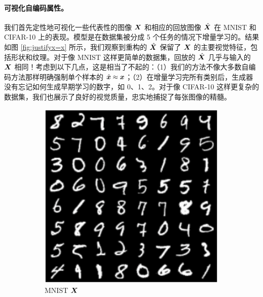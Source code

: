 \documentclass[../../book-main.tex]{subfiles}
\begin{document}
\paragraph{可视化自编码属性。}
我们首先定性地可视化一些代表性的图像 $\bm{X}$ 和相应的回放图像 $\hat{\bm{X}}$ 在 MNIST 和 CIFAR-10 上的表现。模型是在数据集被分成 5 个任务的情况下增量学习的。结果如图 \ref{fig:justifyx=x} 所示，我们观察到重构的 $\hat{\bm{X}}$ 保留了 $\bm{X}$ 的主要视觉特征，包括形状和纹理。对于像 MNIST 这样更简单的数据集，回放的 $\hat{\bm{X}}$ 几乎与输入的 $\bm{X}$ 相同！考虑到以下几点，这是相当了不起的：（1）我们的方法不像大多数自编码方法那样明确强制单个样本的 $\hat{\bm{x}} \approx \bm{x}$；（2）在增量学习完所有类别后，生成器没有忘记如何生成早期学习的数字，如 0、1、2。对于像 CIFAR-10 这样更复杂的数据集，我们也展示了良好的视觉质量，忠实地捕捉了每张图像的精髓。

\begin{figure}[t]
    \begin{subfigure}[t]{0.20\textwidth}
        \centering
        \includegraphics[width=\textwidth]{figs_chap6/mnist_x.png}
        \caption{MNIST $\bm{X}$}
    \end{subfigure}
    \hfill
    \begin{subfigure}[t]{0.20\textwidth}
        \centering

\end{subfigure}
\end{figure}
\end{document}
